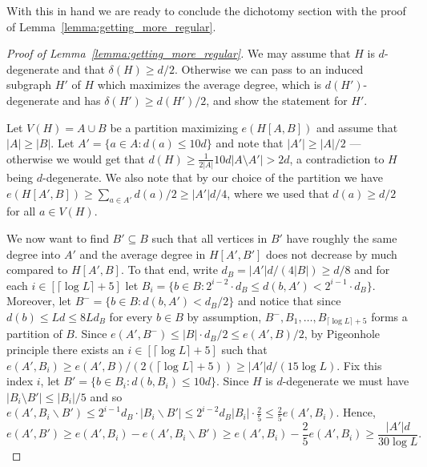 \documentclass[10pt, a4paper]{article}
\numberwithin{theorem}{section} %
\theoremstyle{remark}
\theoremstyle{definition}
\begin{document}
With this in hand we are ready to conclude the dichotomy section with the proof of Lemma~\ref{lemma:getting_more_regular}.
\begin{proof}[Proof of Lemma~\ref{lemma:getting_more_regular}]
    We may assume that $H$ is $d$-degenerate and that $\delta(H) \geq d/2$.
    Otherwise we can pass to an induced subgraph $H'$ of $H$ which maximizes the average degree, which is $d(H')$-degenerate and has $\delta(H') \geq d(H')/2$, and show the statement for $H'$.
    
    Let $V(H) =  A \cup B$ be a partition maximizing $e(H[A, B])$ and assume that $|A| \geq |B|$.
    Let $A' =\{ a \in A : d(a) \leq 10d \}$ and note that $|A'| \geq |A|/2$ --- otherwise we would get that $d(H) \geq \frac{1}{2|A|}10d |A\setminus A'|  > 2d$, a contradiction to $H$ being $d$-degenerate.
    We also note that by our choice of the partition we have $e(H[A', B]) \geq \sum_{a\in A'}d(a)/2\ge |A'| d/4$, where we used that $d(a)\geq d/2$ for all $a\in V(H)$.

    We now want to find $B' \subseteq B$ such that all vertices in $B'$ have roughly the same degree into $A'$ and the average degree in $H[A', B']$ does not decrease by much compared to $H[A', B]$.
    To that end, write $d_B = |A'|d / (4|B|) \geq d/8$ and for each $i \in [\lceil \log L\rceil + 5]$ let $B_i = \{ b \in B: 2^{i-2}\cdot d_B \leq d(b, A') < 2^{i-1} \cdot d_B \}$.
    Moreover, let $B^{-} =\{ b\in B: d(b, A') < d_B /2 \}$ and notice that since $d(b) \leq Ld \leq 8Ld_B$ for every $b \in B$ by assumption, $B^-, B_1, \dots, B_{\lceil \log L\rceil + 5}$ forms a partition of $B$. 
    Since $e(A', B^{-}) \leq |B| \cdot d_B/2 \leq e(A', B)/2$, by Pigeonhole principle there exists an $i \in [\lceil \log L\rceil + 5]$ such that $e(A', B_i) \geq e(A', B)/\left(2(\lceil \log L\rceil +5)\right) \geq |A'|d/\left(15\log L\right)$.
    Fix this index $i$, let $B' = \{ b \in B_i : d(b, B_i) \leq 10 d\}$.
    Since $H$ is $d$-degenerate we must have $|B_i \setminus B'| \leq |B_i| / 5$ and so $e(A', B_i\backslash B')\leq 2^{i-1}d_B\cdot  |B_i\backslash B'|\leq 2^{i-2}d_B|B_i|\cdot \frac{2}{5}\leq \frac{2}{5}e(A', B_i)$. Hence,
    \[
        e(A', B') \geq e(A', B_i)-e(A', B_i\backslash B')  \geq e(A', B_i) - \frac{2}{5}e(A', B_i) \geq \frac{|A'|d}{30\log L}.
    \]


\end{proof}
\end{document}
